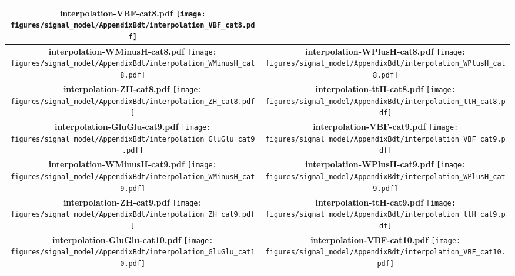 \begin{longtable}{|c|c|}
{\centering
{\bfseries interpolation-VBF-cat8.pdf}
\texttt{[image: figures/signal\_model/AppendixBdt/interpolation\_VBF\_cat8.pdf]}
}
 \\
\hline
\parbox{0.47\textwidth}{
\centering
{\bfseries interpolation-WMinusH-cat8.pdf}
\texttt{[image: figures/signal\_model/AppendixBdt/interpolation\_WMinusH\_cat8.pdf]}
}
 & \parbox{0.47\textwidth}{
\centering
{\bfseries interpolation-WPlusH-cat8.pdf}
\texttt{[image: figures/signal\_model/AppendixBdt/interpolation\_WPlusH\_cat8.pdf]}
}
 \\
\hline
\parbox{0.47\textwidth}{
\centering
{\bfseries interpolation-ZH-cat8.pdf}
\texttt{[image: figures/signal\_model/AppendixBdt/interpolation\_ZH\_cat8.pdf]}
}
 & \parbox{0.47\textwidth}{
\centering
{\bfseries interpolation-ttH-cat8.pdf}
\texttt{[image: figures/signal\_model/AppendixBdt/interpolation\_ttH\_cat8.pdf]}
}
 \\
\hline
\parbox{0.47\textwidth}{
\centering
{\bfseries interpolation-GluGlu-cat9.pdf}
\texttt{[image: figures/signal\_model/AppendixBdt/interpolation\_GluGlu\_cat9.pdf]}
}
 & \parbox{0.47\textwidth}{
\centering
{\bfseries interpolation-VBF-cat9.pdf}
\texttt{[image: figures/signal\_model/AppendixBdt/interpolation\_VBF\_cat9.pdf]}
}
 \\
\hline
\parbox{0.47\textwidth}{
\centering
{\bfseries interpolation-WMinusH-cat9.pdf}
\texttt{[image: figures/signal\_model/AppendixBdt/interpolation\_WMinusH\_cat9.pdf]}
}
 & \parbox{0.47\textwidth}{
\centering
{\bfseries interpolation-WPlusH-cat9.pdf}
\texttt{[image: figures/signal\_model/AppendixBdt/interpolation\_WPlusH\_cat9.pdf]}
}
 \\
\hline
\parbox{0.47\textwidth}{
\centering
{\bfseries interpolation-ZH-cat9.pdf}
\texttt{[image: figures/signal\_model/AppendixBdt/interpolation\_ZH\_cat9.pdf]}
}
 & \parbox{0.47\textwidth}{
\centering
{\bfseries interpolation-ttH-cat9.pdf}
\texttt{[image: figures/signal\_model/AppendixBdt/interpolation\_ttH\_cat9.pdf]}
}
 \\
\hline
\parbox{0.47\textwidth}{
\centering
{\bfseries interpolation-GluGlu-cat10.pdf}
\texttt{[image: figures/signal\_model/AppendixBdt/interpolation\_GluGlu\_cat10.pdf]}
}
 & \parbox{0.47\textwidth}{
\centering
{\bfseries interpolation-VBF-cat10.pdf}
\texttt{[image: figures/signal\_model/AppendixBdt/interpolation\_VBF\_cat10.pdf]}
}
\end{longtable}
